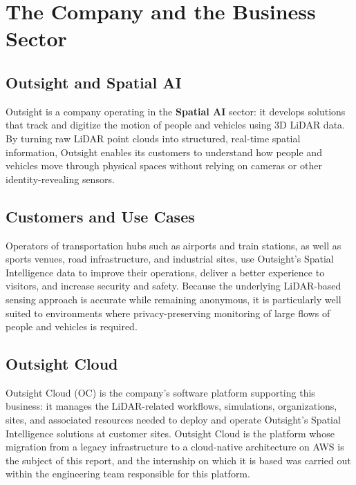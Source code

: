 \chapter{The Company and the Business Sector}
\label{chap:company}

\section{Outsight and Spatial AI}
Outsight is a company operating in the \textbf{Spatial AI} sector: it develops solutions that track and digitize the motion of people and vehicles using 3D LiDAR data. By turning raw LiDAR point clouds into structured, real-time spatial information, Outsight enables its customers to understand how people and vehicles move through physical spaces without relying on cameras or other identity-revealing sensors.

\section{Customers and Use Cases}
Operators of transportation hubs such as airports and train stations, as well as sports venues, road infrastructure, and industrial sites, use Outsight's Spatial Intelligence data to improve their operations, deliver a better experience to visitors, and increase security and safety. Because the underlying LiDAR-based sensing approach is accurate while remaining anonymous, it is particularly well suited to environments where privacy-preserving monitoring of large flows of people and vehicles is required.

\section{Outsight Cloud}
Outsight Cloud (OC) is the company's software platform supporting this business: it manages the LiDAR-related workflows, simulations, organizations, sites, and associated resources needed to deploy and operate Outsight's Spatial Intelligence solutions at customer sites. Outsight Cloud is the platform whose migration from a legacy infrastructure to a cloud-native architecture on AWS is the subject of this report, and the internship on which it is based was carried out within the engineering team responsible for this platform.
